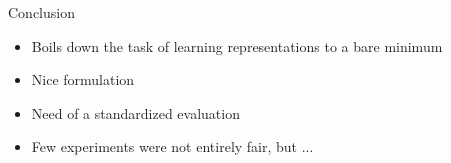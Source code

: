 


\begin{frame}{Conclusion}
  \begin{itemize}
  \item Boils down the task of learning representations to a bare minimum
  \item Nice formulation
  \item Need of a standardized evaluation
  \item Few experiments were not entirely fair, but ...
  \end{itemize}
\end{frame}

